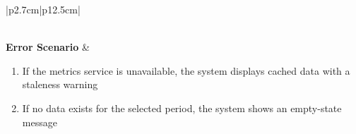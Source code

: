 \begin{table}[H]
\begin{tabular}{|p{2.7cm}|p{12.5cm}|}
\begin{minipage}[t]{\linewidth}
                                  \end{minipage}                                            \\
        \hline
        \textbf{Error Scenario} & \begin{minipage}[t]{\linewidth}
                                      \begin{enumerate}[topsep=0pt,itemsep=1pt,parsep=0pt,partopsep=0pt]
                                          \item If the metrics service is unavailable, the system displays cached data with a
                                                staleness warning
                                          \item If no data exists for the selected period, the system shows an empty-state
                                                message
                                      \end{enumerate}
                                  \end{minipage}                                            \\
        \hline
    \end{tabular}
    \label{tab:admin-dashboard}
\end{table}
